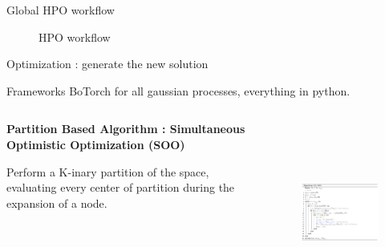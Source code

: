 \begin{frame}{Global HPO workflow}
            \begin{figure}
                \centering
                
                \caption{HPO workflow}
            \end{figure}
    
\end{frame}

\begin{frame}[allowframebreaks]{Optimization : generate the new solution}
    \begin{block}{Frameworks}
        BoTorch for all gaussian processes, everything in python.
    \end{block}

    \framebreak

    \begin{columns}
        \begin{column}{0.3\textwidth}
            \textbf{Partition Based Algorithm : Simultaneous Optimistic Optimization (SOO)}

            Perform a K-inary partition of the space, evaluating every center of partition during the expansion of a node.
            
        \end{column}        
        \begin{column}{0.7\textwidth}
            \begin{figure}[h]
                \centering
                \includegraphics[height = 6cm]{imgs/algo/soo.png}
            \end{figure}
        \end{column}
    \end{columns}


\end{frame}
